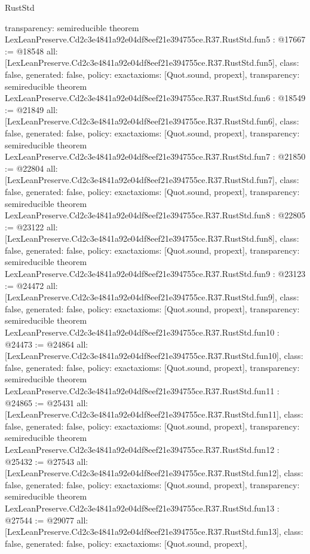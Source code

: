 \begin{lexlean}{RustStd}
\begin{coremodule}
{  transparency: semireducible
}
theorem LexLeanPreserve.Cd2c3e4841a92e04df8eef21e394755ce.R37.RustStd.fun5 : @17667 := @18548 {
  all: [LexLeanPreserve.Cd2c3e4841a92e04df8eef21e394755ce.R37.RustStd.fun5],
  class: false,
  generated: false,
  policy: exact{axioms: [Quot.sound, propext]},
  transparency: semireducible
}
theorem LexLeanPreserve.Cd2c3e4841a92e04df8eef21e394755ce.R37.RustStd.fun6 : @18549 := @21849 {
  all: [LexLeanPreserve.Cd2c3e4841a92e04df8eef21e394755ce.R37.RustStd.fun6],
  class: false,
  generated: false,
  policy: exact{axioms: [Quot.sound, propext]},
  transparency: semireducible
}
theorem LexLeanPreserve.Cd2c3e4841a92e04df8eef21e394755ce.R37.RustStd.fun7 : @21850 := @22804 {
  all: [LexLeanPreserve.Cd2c3e4841a92e04df8eef21e394755ce.R37.RustStd.fun7],
  class: false,
  generated: false,
  policy: exact{axioms: [Quot.sound, propext]},
  transparency: semireducible
}
theorem LexLeanPreserve.Cd2c3e4841a92e04df8eef21e394755ce.R37.RustStd.fun8 : @22805 := @23122 {
  all: [LexLeanPreserve.Cd2c3e4841a92e04df8eef21e394755ce.R37.RustStd.fun8],
  class: false,
  generated: false,
  policy: exact{axioms: [Quot.sound, propext]},
  transparency: semireducible
}
theorem LexLeanPreserve.Cd2c3e4841a92e04df8eef21e394755ce.R37.RustStd.fun9 : @23123 := @24472 {
  all: [LexLeanPreserve.Cd2c3e4841a92e04df8eef21e394755ce.R37.RustStd.fun9],
  class: false,
  generated: false,
  policy: exact{axioms: [Quot.sound, propext]},
  transparency: semireducible
}
theorem LexLeanPreserve.Cd2c3e4841a92e04df8eef21e394755ce.R37.RustStd.fun10 : @24473 := @24864 {
  all: [LexLeanPreserve.Cd2c3e4841a92e04df8eef21e394755ce.R37.RustStd.fun10],
  class: false,
  generated: false,
  policy: exact{axioms: [Quot.sound, propext]},
  transparency: semireducible
}
theorem LexLeanPreserve.Cd2c3e4841a92e04df8eef21e394755ce.R37.RustStd.fun11 : @24865 := @25431 {
  all: [LexLeanPreserve.Cd2c3e4841a92e04df8eef21e394755ce.R37.RustStd.fun11],
  class: false,
  generated: false,
  policy: exact{axioms: [Quot.sound, propext]},
  transparency: semireducible
}
theorem LexLeanPreserve.Cd2c3e4841a92e04df8eef21e394755ce.R37.RustStd.fun12 : @25432 := @27543 {
  all: [LexLeanPreserve.Cd2c3e4841a92e04df8eef21e394755ce.R37.RustStd.fun12],
  class: false,
  generated: false,
  policy: exact{axioms: [Quot.sound, propext]},
  transparency: semireducible
}
theorem LexLeanPreserve.Cd2c3e4841a92e04df8eef21e394755ce.R37.RustStd.fun13 : @27544 := @29077 {
  all: [LexLeanPreserve.Cd2c3e4841a92e04df8eef21e394755ce.R37.RustStd.fun13],
  class: false,
  generated: false,
  policy: exact{axioms: [Quot.sound, propext]},
}
\end{coremodule}
\end{lexlean}
